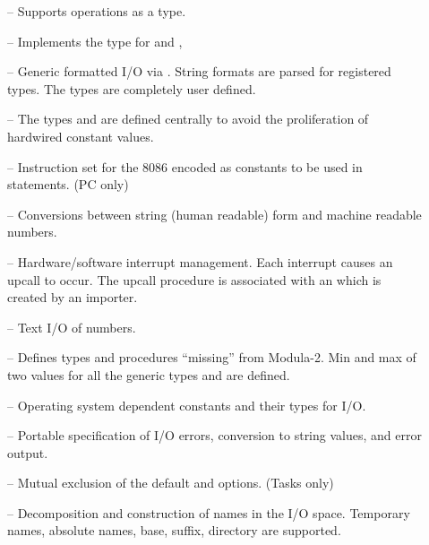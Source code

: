 \begin{description}
\item[] --
    Supports  operations as a  type.

\item[] --
    Implements the  type for  and 
    ,

\item[] --
    Generic formatted I/O via .  String formats are parsed
    for registered types.  The types are completely user defined.

\item[] --
    The types  and  are defined centrally
    to avoid the proliferation of hardwired constant values.

\item[] --
    Instruction set for the 8086 encoded as constants to be used in
     statements. (PC only)

\item[] --
    Conversions between string (human readable) form and
    machine readable  numbers.

\item[] --
    Hardware/\-software interrupt management.  Each interrupt causes
    an upcall to occur.  The upcall procedure is associated with
    an  which is created by an importer.

\item[] --
    Text I/O of  numbers.

\item[] --
    Defines types and procedures ``missing'' from Modula-2.
    Min and max of two values for all the generic types
    and  are defined.

\item[] --
    Operating system dependent constants and their types for I/O.

\item[] --
    Portable specification of I/O errors, conversion to string values,
    and error output.

\item[] --
    Mutual exclusion of the default  and 
    options. (Tasks only)

\item[] --
    Decomposition and construction of names in the I/O space.  
    Temporary names, absolute names, base, suffix, directory are
    supported.


\end{description}
